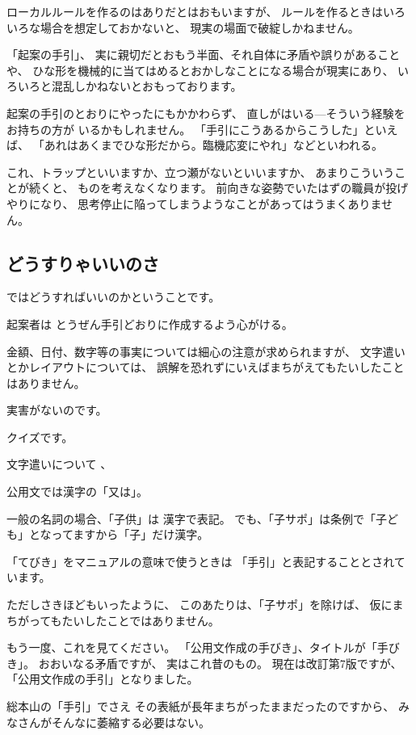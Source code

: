 \documentclass[uplatex,jis2004,dvipdfmx,12pt]{jsarticle}
\begin{document}
ローカルルールを作るのはありだとはおもいますが、
ルールを作るときはいろいろな場合を想定しておかないと、
現実の場面で破綻しかねません。
\fi

「起案の手引」、
実に親切だとおもう半面、それ自体に矛盾や誤りがあることや、
ひな形を機械的に当てはめるとおかしなことになる場合が現実にあり、
いろいろと混乱しかねないとおもっております。

起案の手引のとおりにやったにもかかわらず、
直しがはいる---そういう経験をお持ちの方が
いるかもしれません。
「手引にこうあるからこうした」といえば、
「あれはあくまでひな形だから。臨機応変にやれ」などといわれる。
\fi

これ、トラップといいますか、立つ瀬がないといいますか、
あまりこういうことが続くと、
ものを考えなくなります。
前向きな姿勢でいたはずの職員が投げやりになり、
思考停止に陥ってしまうようなことがあってはうまくありません。

\subsection{どうすりゃいいのさ}


ではどうすればいいのかということです。

起案者は
とうぜん手引どおりに作成するよう心がける。

金額、日付、数字等の事実については細心の注意が求められますが、
文字遣いとかレイアウトについては、
誤解を恐れずにいえばまちがえてもたいしたことはありません。

実害がないのです。

クイズです。

文字遣いについて
、

公用文では漢字の「又は」。

一般の名詞の場合、「子供」は
漢字で表記。
でも、「子サポ」は条例で「子ども」となってますから「子」だけ漢字。



「てびき」をマニュアルの意味で使うときは
「手引」と表記することとされています。

ただしさきほどもいったように、
このあたりは、「子サポ」を除けば、
仮にまちがってもたいしたことではありません。

もう一度、これを見てください。
「公用文作成の手びき」、タイトルが「手びき」。
おおいなる矛盾ですが、
実はこれ昔のもの。
現在は改訂第7版ですが、
「公用文作成の手引」となりました。

総本山の「手引」でさえ
その表紙が長年まちがったままだったのですから、
みなさんがそんなに萎縮する必要はない。
\end{document}
